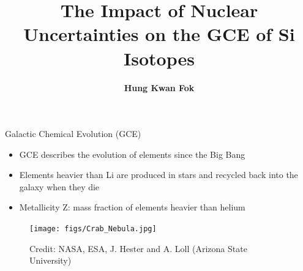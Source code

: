 \documentclass[10pt]{beamer}
\title{The Impact of Nuclear Uncertainties on the GCE of Si Isotopes}
\date{}
\author{\textbf{Hung Kwan Fok}}
\institute{Brandeis University}
\begin{document}
\maketitle



    

\begin{frame}{Galactic Chemical Evolution (GCE)}

\begin{minipage}{5.5cm}
    \begin{itemize}
    \setlength\itemsep{2em}
        \item GCE describes the evolution of elements since the Big Bang
        \item Elements heavier than Li are produced in stars and recycled back into the galaxy when they die
        \item Metallicity Z: mass fraction of elements heavier than helium 
    \end{itemize}
\end{minipage}
\hspace*{3mm}
\begin{minipage}{4.5cm}
    \begin{figure}
        \centering
        \texttt{[image: figs/Crab\_Nebula.jpg]}
        \caption*{Credit: NASA, ESA, J. Hester and A. Loll (Arizona State University)}
    \end{figure}
\end{minipage}
    
\end{frame}
\end{document}
